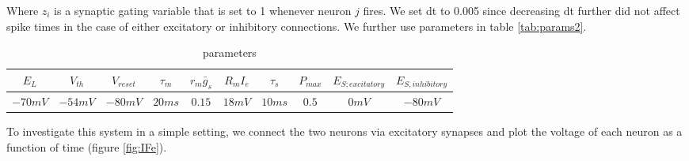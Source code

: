 \documentclass{article}
\begin{document}
Where $z_i$ is a synaptic gating variable that is set to 1 whenever neuron $j$ fires. We set dt to 0.005 since decreasing dt further did not affect spike times in the case of either excitatory or inhibitory connections. We further use parameters in table \ref{tab:params2}.

\begin{table}[h]
\centering
\begin{tabular}{ |c|c|c|c|c|c|c|c|c|c|}
\hline
 $E_L$ &  $V_{th}$ & $V_{reset}$ & $\tau_m$ & $r_m \bar g_s$ & $R_m I_e$ & $\tau_s$ & $P_{max}$ & $E_{S; excitatory}$ & $E_{S, inhibitory}$\\
\hline
$-70 mV $ & $ -54 mV $ & $ -80 mV $ & $ 20 ms $ & $ 0.15 $ & $18 mV$ & $10 ms$ & $0.5$ & $0 mV$ & $-80 mV$\\
\hline
\end{tabular}
\caption{parameters}
\label{tab:paramsif}
\end{table}

To investigate this system in a simple setting, we connect the two neurons via excitatory synapses and plot the voltage of each neuron as a function of time (figure \ref{fig:IFe}).
\end{document}

